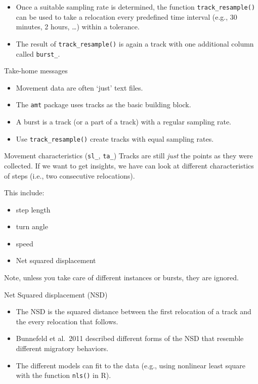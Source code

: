 \documentclass[ignorenonframetext,,t]{beamer}
\providecommand{\tightlist}{%
\setlength{\itemsep}{0pt}\setlength{\parskip}{0pt}}
\providecommand{\tightlist}{%
\setlength{\itemsep}{0pt}\setlength{\parskip}{0pt}}
\renewcommand{\tightlist}{\setlength{\itemsep}{1.4ex}\setlength{\parskip}{0pt}}
\begin{document}
\begin{frame}[fragile]
\begin{itemize}
\tightlist
\item
  Once a suitable sampling rate is determined, the function
  \texttt{track\_resample()} can be used to take a relocation every
  predefined time interval (e.g., 30 minutes, 2 hours, \ldots) within a
  tolerance.
\item
  The result of \texttt{track\_resample()} is again a track with one
  additional column called \texttt{burst\_}.
\end{itemize}
\end{frame}

\begin{frame}[fragile]{Take-home messages}
\protect\hypertarget{take-home-messages}{}
\begin{itemize}
\tightlist
\item
  Movement data are often `just' text files.
\item
  The \texttt{amt} package uses tracks as the basic building block.
\item
  A burst is a track (or a part of a track) with a regular sampling
  rate.
\item
  Use \texttt{track\_resample()} create tracks with equal sampling
  rates.
\end{itemize}
\end{frame}

\begin{frame}{Movement characteristics (\texttt{sl\_}, \texttt{ta\_})}
\protect\hypertarget{movement-characteristics-sl_-ta_}{}
Tracks are still \emph{just} the points as they were collected. If we
want to get insights, we have can look at different characteristics of
steps (i.e., two consecutive relocations).

This include:

\begin{itemize}
\tightlist
\item
  step length
\item
  turn angle
\item
  speed
\item
  Net squared displacement
\end{itemize}

Note, unless you take care of different instances or bursts, they are
ignored.
\end{frame}

\begin{frame}[fragile]{Net Squared displacement (NSD)}
\protect\hypertarget{net-squared-displacement-nsd}{}
\begin{itemize}
\tightlist
\item
  The NSD is the squared distance between the first relocation of a
  track and the every relocation that follows.
\item
  Bunnefeld et al.~2011 described different forms of the NSD that
  resemble different migratory behaviors.
\item
  The different models can fit to the data (e.g., using nonlinear least
  square with the function \texttt{nls()} in R).
\end{itemize}
\end{frame}
\end{document}
